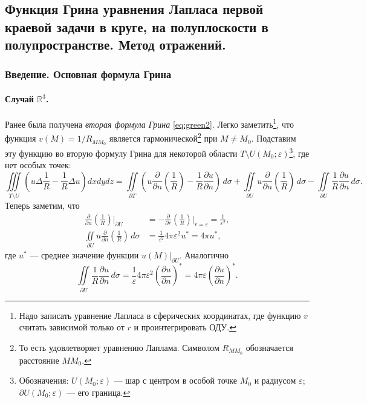 \subsection{Функция Грина уравнения Лапласа первой краевой задачи в круге, на полуплоскости в полупространстве. Метод отражений.}
\subsubsection{Введение. Основная формула Грина}
\paragraph{Случай $ \mathbb R^3 $.}
Ранее была получена \emph{вторая формула Грина} \eqref{eq:green2}. Легко
заметить\footnote{Надо записать уравнение Лапласа в сферических координатах, где
функцию $ v $ считать зависимой только от $ r $ и проинтегрировать ОДУ.}, что
функция $ v(M) = 1/R_{MM_0} $ является гармонической\footnote{То есть
  удовлетворяет уравнению Лаплама. Символом $ R_{MM_0} $ обозначается расстояние
$ MM_0 $.} при $ M \neq M_0 $. Подставим эту функцию во вторую формулу Грина для
некоторой области $ T\setminus U(M_0; \varepsilon) $\footnote{Обозначения: $ U(M_0;
\varepsilon) $ --- шар с центром в особой точке $ M_0 $ и радиусом $ \varepsilon
$; $ \partial U(M_0; \varepsilon) $ --- его граница.}, где нет особых точек: 
\[
  \iiint\limits_{T\setminus U} \left( u\Delta \frac{1}{R} - \frac{1}{R}\Delta u \right)
  dxdydz = \iint\limits_{\partial T} \left( u \frac{\partial}{\partial n}
  \left(\frac{1}{R}\right) - \frac{1}{R} \frac{\partial u}{\partial n} \right)
  \,d\sigma + \iint\limits_{\partial U} u \frac{\partial}{\partial n} \left(
  \frac{1}{R} \right) \, d\sigma - \iint\limits_{\partial U} \frac{1}{R}
  \frac{\partial u}{\partial n}\,d\sigma.
\]
Теперь заметим, что 
\begin{align*}
  \frac{\partial}{\partial n} \left( \frac{1}{R} \right) \bigg|_{\partial U} &= -
  \frac{\partial}{\partial r} \left( \frac{1}{R} \right) \bigg|_{r=\varepsilon} =
  \frac{1}{\varepsilon^2},\\
  \iint\limits_{\partial U} u \frac{\partial}{\partial n} \left( \frac{1}{R}
\right)\, d\sigma &= \frac{1}{\varepsilon^2} 4\pi\varepsilon^2 u^\ast = 4\pi
  u^\ast,
\end{align*}
где $ u^\ast $ --- среднее значение функции $ u(M)|_{\partial U} $. Аналогично 
\[
  \iint\limits_{\partial U} \frac{1}{R} \frac{\partial u}{\partial n}\,d\sigma =
  \frac{1}{\varepsilon} 4\pi\varepsilon^2 \left( \frac{\partial u}{\partial n}
  \right)^\ast = 4\pi\varepsilon \left( \frac{\partial u}{\partial n}
  \right)^\ast.
\]
